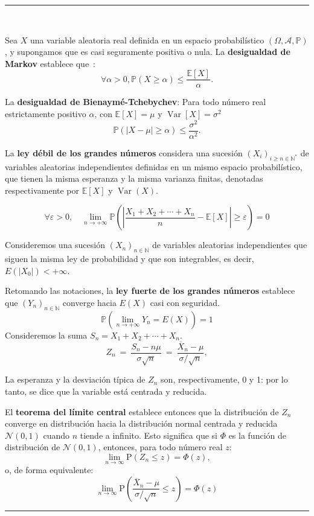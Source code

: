 \hrule
\begin{f} {\ }
	
	Sea \(X\) una variable aleatoria real definida en un espacio probabilístico \(\left(\Omega,\mathcal A,\mathbb P\right)\), y supongamos que es casi seguramente positiva o nula. La \textbf{desigualdad de Markov} establece que~:
	\[
	\forall \alpha >0, \mathbb P(X\geq \alpha)\leqslant\frac{\mathbb{E}[X]}{\alpha}.
	\]
	
	La \textbf{desigualdad de Bienaymé-Tchebychev}: 
Para todo número real estrictamente positivo \(\alpha\), con \(\mathbb{E}[X]=\mu\) y \(\operatorname{Var}[X]=\sigma^2\)
	\[
	\mathbb{P}\left(\left|X-\mu\right| \geq \alpha \right) \leq \frac{\sigma^2}{\alpha^2}.
	\]
	
	La \textbf{ley débil de los grandes números} considera una sucesión \((X_i)_{i\geq n\in\mathbb{N}^*}\) de variables aleatorias independientes definidas en un mismo espacio probabilístico, que tienen la misma esperanza y la misma varianza finitas, denotadas respectivamente por \(\mathbb{E}[X]\) y \(\operatorname{Var}(X)\).
	
	\[
	\forall\varepsilon>0,\quad \lim_{n \to +\infty} \mathbb{P}\left(\left|\frac{X_1+X_2+\cdots+X_n}{n} - \mathbb{E}[X]\right| \geq \varepsilon\right) = 0
	\]
	
	Consideremos una sucesión \((X_n)_{n\in \mathbb{N}}\) de variables aleatorias independientes que siguen la misma ley de probabilidad y que son integrables, es decir, \(E(|X_0|)<+\infty\). 
	
	Retomando las notaciones, la \textbf{ley fuerte de los grandes números} establece que \((Y_n)_{n\in\mathbb{N}}\) converge hacia \(E(X)\) casi con seguridad.
	\[
	\mathbb{P}\left(\lim_{n \to +\infty} Y_n = E(X)\right)=1
	\]
	Consideremos la suma \(S_n = X_1 + X_2 + \cdots + X_n\).
	\[   
	Z_n\ =\ \frac{S_n - n \mu}{\sigma \sqrt{n}}\ =\ \frac{\overline{X}_n-\mu}{\sigma/\sqrt{n}},
	\]
	
	La esperanza y la desviación típica de \(Z_n\) son, respectivamente, 0 y 1: por lo tanto, se dice que la variable está centrada y reducida.
	
	El \textbf{teorema del límite central} establece entonces que la distribución de \(Z_n\) converge en distribución hacia la distribución normal centrada y reducida \(\mathcal{N} (0 , 1)\) cuando \(n\) tiende a infinito. Esto significa que si \(\Phi\) es la función de distribución de \(\mathcal{N} (0 , 1)\), entonces, para todo número real \(z\):
	\[
	\lim_{n \to \infty} \mbox{P}(Z_n \le z) = \Phi(z),
	\]
	o, de forma equivalente:
	\[
	\lim_{n\to\infty}\mbox{P}\left(\frac{\overline{X}_n-\mu}{\sigma/\sqrt{n}}\leq z\right)=\Phi(z)
	\]
\end{f}
\hrule

